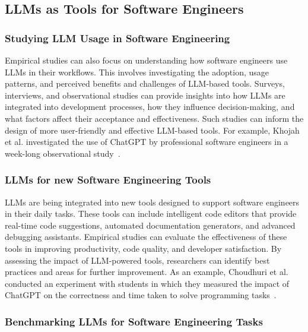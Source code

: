 \documentclass[11pt]{article}
\begin{document}
\subsection{LLMs as Tools for Software Engineers}

\subsubsection{Studying LLM Usage in Software Engineering}

Empirical studies can also focus on understanding how software engineers use LLMs in their workflows. This involves investigating the adoption, usage patterns, and perceived benefits and challenges of LLM-based tools. Surveys, interviews, and observational studies can provide insights into how LLMs are integrated into development processes, how they influence decision-making, and what factors affect their acceptance and effectiveness. Such studies can inform the design of more user-friendly and effective LLM-based tools.
For example, Khojah et al. investigated the use of ChatGPT by professional software engineers in a week-long observational study~\cite{DBLP:journals/pacmse/KhojahM0N24}.

\subsubsection{LLMs for new Software Engineering Tools}

LLMs are being integrated into new tools designed to support software engineers in their daily tasks. These tools can include intelligent code editors that provide real-time code suggestions, automated documentation generators, and advanced debugging assistants. Empirical studies can evaluate the effectiveness of these tools in improving productivity, code quality, and developer satisfaction. By assessing the impact of LLM-powered tools, researchers can identify best practices and areas for further improvement.
As an example, Choudhuri et al. conducted an experiment with students in which they measured the impact of ChatGPT on the correctness and time taken to solve programming tasks~\cite{DBLP:conf/icse/ChoudhuriLSGS24}.

\subsubsection{Benchmarking LLMs for Software Engineering Tasks}
\end{document}
